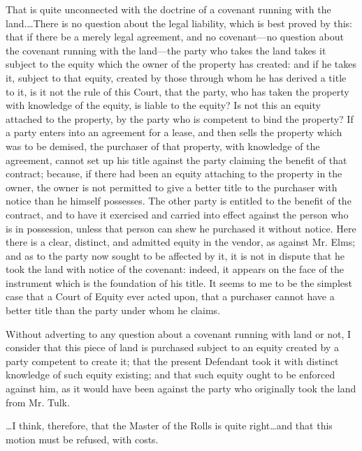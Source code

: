 That is quite unconnected with the doctrine of a covenant running with the
land.\ldots There is no question about the legal liability, which is best proved
by this: that if there be a merely legal agreement, and no covenant---no
question about the covenant running with the land---the party who takes the land
takes it subject to the equity which the owner of the property has created: and
if he takes it, subject to that equity, created by those through whom he has
derived a title to it, is it not the rule of this Court, that the party, who has
taken the property with knowledge of the equity, is liable to the equity? Is not
this an equity attached to the property, by the party who is competent to bind
the property? If a party enters into an agreement for a lease, and then sells
the property which was to be demised, the purchaser of that property, with
knowledge of the agreement, cannot set up his title against the party claiming
the benefit of that contract; because, if there had been an equity attaching to
the property in the owner, the owner is not permitted to give a better title to
the purchaser with notice than he himself possesses. The other party is entitled
to the benefit of the contract, and to have it exercised and carried into effect
against the person who is in possession, unless that person can shew he
purchased it without notice. Here there is a clear, distinct, and admitted
equity in the vendor, as against Mr. Elms; and as to the party now sought to be
affected by it, it is not in dispute that he took the land with notice of the
covenant: indeed, it appears on the face of the instrument which is the
foundation of his title. It seems to me to be the simplest case that a Court of
Equity ever acted upon, that a purchaser cannot have a better title than the
party under whom he claims.

Without adverting to any question about a covenant running with land or not, I
consider that this piece of land is purchased subject to an equity created by a
party competent to create it; that the present Defendant took it with distinct
knowledge of such equity existing; and that such equity ought to be enforced
against him, as it would have been against the party who originally took the
land from Mr. Tulk.

\ldots I think, therefore, that the Master of the Rolls is quite right\ldots and
that this motion must be refused, with costs.



